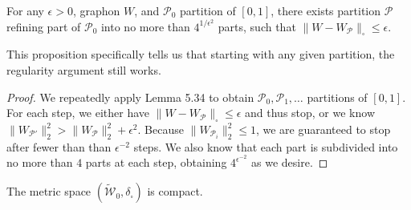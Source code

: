 \begin{proposition}[5.35]
For any $\epsilon>0$, graphon $W$, and $\mathcal P_0$ partition of $[0,1]$, there exists partition $\mathcal P$ refining part of $\mathcal P_0$ into no more than $4^{1/\epsilon^2}$ parts, such that $\|W-W_{\mathcal P}\|_\square\leq\epsilon$.
\end{proposition}
This proposition specifically tells us that starting with any given partition, the regularity argument still works.
\begin{proof}
We repeatedly apply Lemma 5.34 to obtain $\mathcal P_0,\mathcal P_1,\ldots$ partitions of $[0,1]$. For each step, we either have $\|W-W_{\mathcal P}\|_\square\leq\epsilon$ and thus stop, or we know $\|W_{\mathcal P'}\|_2^2>\|W_{\mathcal P}\|_2^2+\epsilon^2$. Because $\|W_{\mathcal P_i}\|_2^2\leq1$, we are guaranteed to stop after fewer than than $\epsilon^{-2}$ steps. We also know that each part is subdivided into no more than $4$ parts at each step, obtaining $4^{\epsilon^{-2}}$ as we desire.
\end{proof}
\begin{theorem}
The metric space $(\widetilde{\mathcal W}_0,\delta_\square)$ is compact.
\end{theorem}
